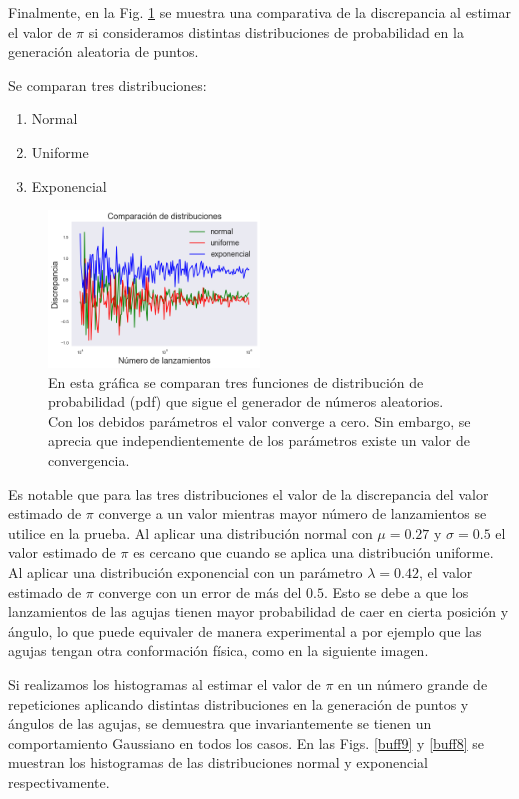 \documentclass{rbf}
\begin{document}
Finalmente, en la Fig. \ref{buff5} se muestra una comparativa de la discrepancia al estimar el valor de $\pi$ si consideramos distintas distribuciones de probabilidad en la generación aleatoria de puntos.

Se comparan tres distribuciones:
\begin{enumerate}
    \item Normal
    \item Uniforme
    \item Exponencial
\end{enumerate}

\begin{figure}[tbp!]
 \centering
  \includegraphics[width=0.5\textwidth]{figures/dist.png}
	\caption{En esta gráfica se comparan tres funciones de distribución de probabilidad (pdf) que sigue el generador de números aleatorios. Con los debidos parámetros el valor converge a cero. Sin embargo, se aprecia que independientemente de los parámetros existe un valor de convergencia. }
 \label{buff5}
\end{figure}

Es notable que para las tres distribuciones el valor de la discrepancia del valor estimado de $\pi$ converge a un valor mientras mayor número de lanzamientos se utilice en la prueba. Al aplicar una distribución normal con $\mu=0.27$ y  $\sigma=0.5$ el valor estimado de $\pi$ es cercano que cuando se aplica una distribución uniforme. Al aplicar una distribución exponencial con un parámetro $\lambda=0.42$, el valor estimado de $\pi$ converge con un error de más del $0.5$. Esto se debe a que los lanzamientos de las agujas tienen mayor probabilidad de caer en cierta posición y ángulo, lo que puede equivaler de manera experimental a por ejemplo que las agujas tengan otra conformación física, como en la siguiente imagen.


Si realizamos los histogramas al estimar el valor de $\pi$ en un número grande de repeticiones aplicando distintas distribuciones en la generación de puntos y ángulos de las agujas, se demuestra que invariantemente se tienen un comportamiento Gaussiano en todos los casos.
 En las Figs. \ref{buff9} y \ref{buff8} se muestran los histogramas de las distribuciones normal y exponencial respectivamente. 
\end{document}
